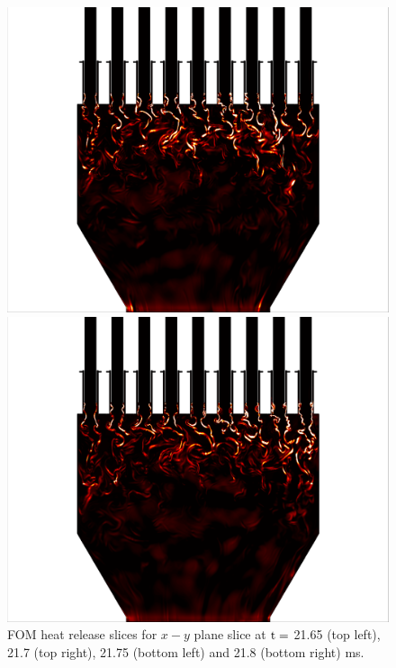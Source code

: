 \begin{figure}
	\begin{minipage}{0.49\linewidth}
		\includegraphics[width=0.99\linewidth,trim={0.5em 0.5em 15em 0.5em},clip]{Chapters/HPROMResults/Images/nineElem/example_snaps/example_heat_z_217500.png}
	\end{minipage}
	\begin{minipage}{0.49\linewidth}
		\includegraphics[width=0.99\linewidth,trim={15em 0.5em 0.5em 0.5em},clip]{Chapters/HPROMResults/Images/nineElem/example_snaps/example_heat_z_218000.png}
	\end{minipage}
	\caption{\label{fig:nineElemFOMHeat}FOM heat release slices for $x-y$ plane slice at $\text{t} = $ 21.65 (top left), 21.7 (top right), 21.75 (bottom left) and 21.8 (bottom right) ms.}
\end{figure}

